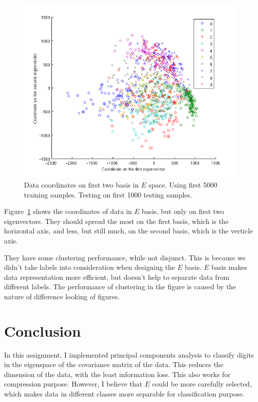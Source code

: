 \documentclass[10pt]{article}
\begin{document}
\begin{figure}
\centering
\includegraphics[width=0.5\columnwidth]{twod_digit.png}
\caption{Data coordinates on first two basis in $E$ space.  Using
first 5000 training samples. Testing on first 1000 testing samples.}
\label{fig:twod}
\end{figure}

Figure~\ref{fig:twod} shows the coordinates of data in $E$ basis, but
only on first two eigenvectors. They should spread the most on the
first basis, which is the horizontal axis, and less, but still much,
on the second basis, which is the verticle axis.

They have some clustering performance, while not disjunct. This is
because we didn't take labels into consideration when designing the
$E$ basis. $E$ basis makes data representation more efficient, but
doesn't help to separate data from different labels. The performance
of clustering in the figure is caused by the nature of difference
looking of figures.

\section{Conclusion}

In this assignment, I implemented principal components analysis to
classify digits in the eigenspace of the covariance matrix of the
data. This reduces the dimension of the data, with the least
information loss. This also works for compression purpose. However, I
believe that $E$ could be more carefully selected, which makes data in
different classes more separable for classification purpose.
\end{document}

